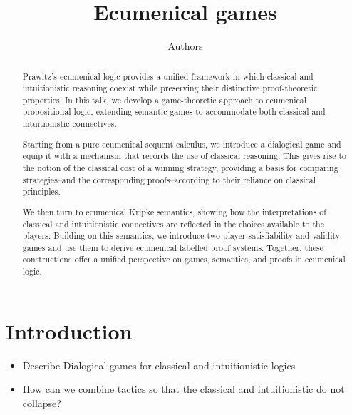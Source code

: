\documentclass[a4paper,UKenglish,cleveref, autoref, thm-restate]{lipics-v2021}
\title{Ecumenical games}
\author{Authors}{Department of Computer Science, University College London, UK}{email}{https://orcid.org/0000-0002-7113-0801}{}
\begin{document}
\maketitle

\begin{abstract}
Prawitz's ecumenical logic provides a unified framework in which classical and intuitionistic reasoning coexist while preserving their distinctive proof-theoretic properties. In this talk, we develop a game-theoretic approach to ecumenical propositional logic, extending semantic games to accommodate both classical and intuitionistic connectives.

Starting from a pure ecumenical sequent calculus, we introduce a dialogical game and equip it with a mechanism that records the use of classical reasoning. This gives rise to the notion of the classical cost of a winning strategy, providing a basis for comparing strategies--and the corresponding proofs--according to their reliance on classical principles.

We then turn to ecumenical Kripke semantics, showing how the interpretations of classical and intuitionistic connectives are reflected in the choices available to the players. Building on this semantics, we introduce two-player satisfiability and validity games and use them to derive ecumenical labelled proof systems. Together, these constructions offer a unified perspective on games, semantics, and proofs in ecumenical logic.
\end{abstract}

\section{Introduction}
\begin{itemize}
\item Describe Dialogical games for classical and intuitionistic logics
\item How can we combine tactics so that the classical and intuitionistic do not collapse?
\end{itemize}
\end{document}
